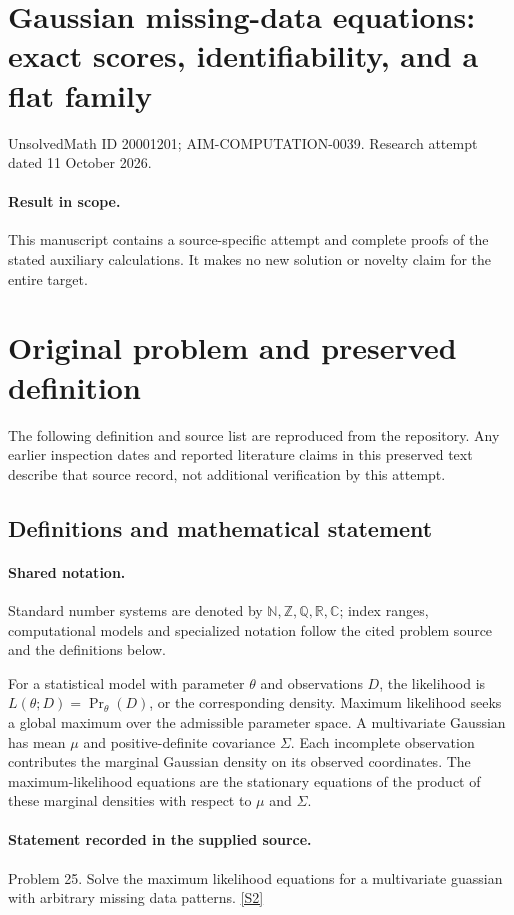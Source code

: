 \documentclass[11pt]{article}
\begin{document}
\section*{Gaussian missing-data equations: exact scores, identifiability, and a flat family}
\noindent UnsolvedMath ID 20001201; AIM-COMPUTATION-0039. Research attempt dated 11 October 2026.
\paragraph{Result in scope.}This manuscript contains a source-specific attempt and complete proofs of the stated auxiliary calculations. It makes no new solution or novelty claim for the entire target.
\section{Original problem and preserved definition}
The following definition and source list are reproduced from the repository. Any earlier inspection dates and reported literature claims in this preserved text describe that source record, not additional verification by this attempt.
\subsection{Definitions and mathematical statement}

\paragraph{Shared notation.}Standard number systems are denoted by $\mathbb N,\mathbb Z,\mathbb Q,\mathbb R,\mathbb C$; index ranges, computational models and specialized notation follow the cited problem source and the definitions below.


For a statistical model with parameter $\theta$ and observations $D$, the likelihood is $L(\theta;D)=\Pr_\theta(D)$, or the corresponding density. Maximum likelihood seeks a global maximum over the admissible parameter space. A multivariate Gaussian has mean $\mu$ and positive-definite covariance $\Sigma$. Each incomplete observation contributes the marginal Gaussian density on its observed coordinates. The maximum-likelihood equations are the stationary equations of the product of these marginal densities with respect to $\mu$ and $\Sigma$.
\paragraph{Statement recorded in the supplied source.}
Problem 25. Solve the maximum likelihood equations for a multivariate guassian with arbitrary missing data patterns. \href{https://aimath.org/WWN/compalgstat/compalgstat.pdf}{[S2]}
\end{document}
